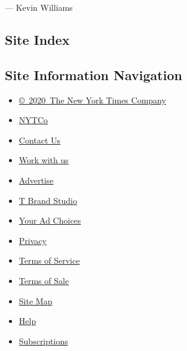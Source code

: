 --- Kevin Williams

\hypertarget{site-index}{%
\subsection{Site Index}\label{site-index}}

\hypertarget{site-information-navigation}{%
\subsection{Site Information
Navigation}\label{site-information-navigation}}

\begin{itemize}
\tightlist
\item
  \href{https://help.nytimes3xbfgragh.onion/hc/en-us/articles/115014792127-Copyright-notice}{©~2020~The
  New York Times Company}
\end{itemize}

\begin{itemize}
\tightlist
\item
  \href{https://www.nytco.com/}{NYTCo}
\item
  \href{https://help.nytimes3xbfgragh.onion/hc/en-us/articles/115015385887-Contact-Us}{Contact
  Us}
\item
  \href{https://www.nytco.com/careers/}{Work with us}
\item
  \href{https://nytmediakit.com/}{Advertise}
\item
  \href{http://www.tbrandstudio.com/}{T Brand Studio}
\item
  \href{https://www.nytimes3xbfgragh.onion/privacy/cookie-policy\#how-do-i-manage-trackers}{Your
  Ad Choices}
\item
  \href{https://www.nytimes3xbfgragh.onion/privacy}{Privacy}
\item
  \href{https://help.nytimes3xbfgragh.onion/hc/en-us/articles/115014893428-Terms-of-service}{Terms
  of Service}
\item
  \href{https://help.nytimes3xbfgragh.onion/hc/en-us/articles/115014893968-Terms-of-sale}{Terms
  of Sale}
\item
  \href{https://spiderbites.nytimes3xbfgragh.onion}{Site Map}
\item
  \href{https://help.nytimes3xbfgragh.onion/hc/en-us}{Help}
\item
  \href{https://www.nytimes3xbfgragh.onion/subscription?campaignId=37WXW}{Subscriptions}
\end{itemize}
